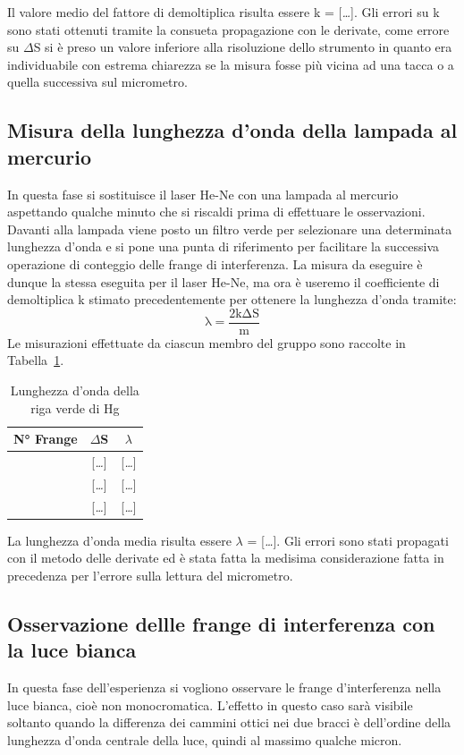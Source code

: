 \documentclass[10pt,a4paper]{article}
\newcommand{\rem}[1]{[\emph{#1}]}
\begin{document}
\noindent Il valore medio del fattore di demoltiplica risulta essere k = \rem{\dots}. Gli errori su k sono stati ottenuti tramite la consueta propagazione con le derivate, come errore su $\Delta$S si è preso un valore inferiore alla risoluzione dello strumento in quanto era individuabile con estrema chiarezza se la misura fosse più vicina ad una tacca o a quella successiva sul micrometro.

\subsection*{Misura della lunghezza d'onda della lampada al mercurio}
In questa fase si sostituisce il laser He-Ne con una lampada al mercurio aspettando qualche minuto che si riscaldi prima di effettuare le osservazioni. Davanti alla lampada viene posto un filtro verde per selezionare una determinata lunghezza d'onda e si pone una punta di riferimento per facilitare la successiva operazione di conteggio delle frange di interferenza. La misura da eseguire è dunque la stessa eseguita per il laser He-Ne, ma ora è useremo il coefficiente di demoltiplica k stimato precedentemente per ottenere la lunghezza d'onda tramite:
\begin{equation*}
\mathrm{\lambda = \frac{2k\Delta S}{m}}
\end{equation*}
Le misurazioni effettuate da ciascun membro del gruppo sono raccolte in Tabella~\ref{tab:hg}.
\begin{table}[h!]
	\centering
	\caption{Lunghezza d'onda della riga verde di Hg}
	\vspace{1mm}
	\begin{tabular}{ccc}
	\hline
	N° Frange & $\Delta$S & $\lambda$ \\ 
	\hline \hline
	\rem{\dots} & \rem{\dots} & \rem{\dots} \\
	\rem{\dots} & \rem{\dots} & \rem{\dots} \\
	\rem{\dots} & \rem{\dots} & \rem{\dots} \\
	\hline
	\end{tabular}
	\label{tab:hg}
\end{table}

\noindent La lunghezza d'onda media risulta essere $\lambda$ = \rem{\dots}. Gli errori sono stati propagati con il metodo delle derivate ed è stata fatta la medisima considerazione fatta in precedenza per l'errore sulla lettura del micrometro.

\subsection*{Osservazione dellle frange di interferenza con la luce bianca}
In questa fase dell'esperienza si vogliono osservare le frange d'interferenza nella luce bianca, cioè non monocromatica. L'effetto in questo caso sarà visibile soltanto quando la differenza dei cammini ottici nei due bracci è dell'ordine della lunghezza d'onda centrale della luce, quindi al massimo qualche micron.
\end{document}
